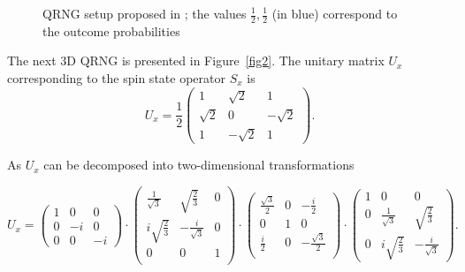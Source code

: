 \documentclass[11pt,a4paper]{article}
\begin{document}
\begin{figure}[ht]
\caption{QRNG setup proposed in \cite{abbott2012strongrandomness}; the values $\frac{1}{2},\frac{1}{2}$ (in blue) correspond to the outcome probabilities}
\label{fig1}
\end{figure}

The next 3D QRNG is presented in
Figure~\ref{fig2}. The unitary matrix $U_{x}$ corresponding to the spin state operator $S_x$ is
 $$ U_x = \frac{1}{2}
 \begin{pmatrix}
 1 & \sqrt{2} & 1\\
 \sqrt{2} & 0 & -\sqrt{2}\\
 1 & -\sqrt{2} & 1
 \end{pmatrix}.$$

As  $U_x$ can be decomposed into two-dimensional transformations~\cite{Clements:16}

$$U_x =
\begin{pmatrix}1&0&0\\
0&-i&0\\
0&0&-i
\end{pmatrix}
\cdot
\begin{pmatrix}
\frac{1}{\sqrt{3}} & \sqrt{\frac{2}{3}} & 0\\
i\sqrt{\frac{2}{3}} & -\frac{i}{\sqrt{3}} & 0\\
0&0&1\\
\end{pmatrix}
\cdot
\begin{pmatrix}
\frac{\sqrt{3}}{2} & 0 & -\frac{i}{2}\\
0&1&0\\
\frac{i}{2}& 0 & -\frac{\sqrt{3}}{2}\\
\end{pmatrix}
\cdot
\begin{pmatrix}
1&0&0\\
0&\frac{1}{\sqrt{3}} &\sqrt{\frac{2}{3}}\\
0 & i\sqrt{\frac{2}{3}} & -\frac{i}{\sqrt{3}}
\end{pmatrix}.
$$
\end{document}
